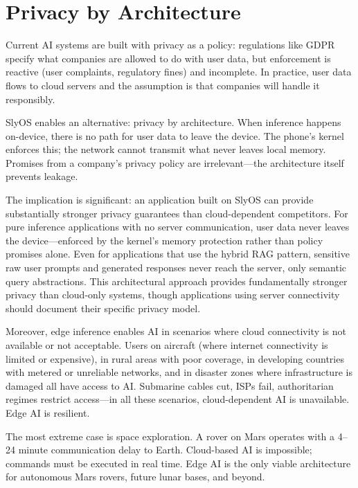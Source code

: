 \documentclass[12pt, letterpaper, twoside]{report}
\begin{document}
\section{Privacy by Architecture}
\label{sec:privacy_architecture}

Current AI systems are built with privacy as a policy: regulations like GDPR specify what companies are allowed to do with user data, but enforcement is reactive (user complaints, regulatory fines) and incomplete. In practice, user data flows to cloud servers and the assumption is that companies will handle it responsibly.

SlyOS enables an alternative: privacy by architecture. When inference happens on-device, there is no path for user data to leave the device. The phone's kernel enforces this; the network cannot transmit what never leaves local memory. Promises from a company's privacy policy are irrelevant---the architecture itself prevents leakage.

The implication is significant: an application built on SlyOS can provide substantially stronger privacy guarantees than cloud-dependent competitors. For pure inference applications with no server communication, user data never leaves the device---enforced by the kernel's memory protection rather than policy promises alone. Even for applications that use the hybrid RAG pattern, sensitive raw user prompts and generated responses never reach the server, only semantic query abstractions. This architectural approach provides fundamentally stronger privacy than cloud-only systems, though applications using server connectivity should document their specific privacy model.

Moreover, edge inference enables AI in scenarios where cloud connectivity is not available or not acceptable. Users on aircraft (where internet connectivity is limited or expensive), in rural areas with poor coverage, in developing countries with metered or unreliable networks, and in disaster zones where infrastructure is damaged all have access to AI. Submarine cables cut, ISPs fail, authoritarian regimes restrict access---in all these scenarios, cloud-dependent AI is unavailable. Edge AI is resilient.

The most extreme case is space exploration. A rover on Mars operates with a 4--24 minute communication delay to Earth. Cloud-based AI is impossible; commands must be executed in real time. Edge AI is the only viable architecture for autonomous Mars rovers, future lunar bases, and beyond.
\end{document}
